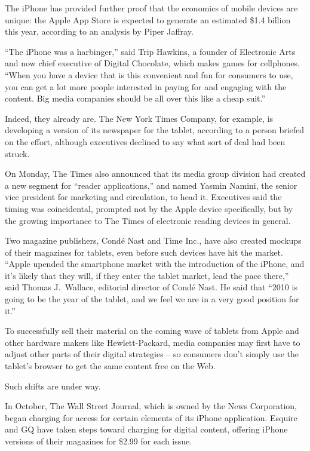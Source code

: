 ﻿\documentclass[12pt]{article}
\begin{document}
The iPhone has provided further proof that the economics of mobile devices are unique: the Apple App
Store is expected to generate an estimated \$1.4 billion this year, according to an analysis by
Piper Jaffray.

``The iPhone was a harbinger,'' said Trip Hawkins, a founder of Electronic Arts and now chief
executive of Digital Chocolate, which makes games for cellphones. ``When you have a device that is
this convenient and fun for consumers to use, you can get a lot more people interested in paying for
and engaging with the content. Big media companies should be all over this like a cheap suit.''

Indeed, they already are. The New York Times Company, for example, is developing a version of its
newspaper for the tablet, according to a person briefed on the effort, although executives declined
to say what sort of deal had been struck.

On Monday, The Times also announced that its media group division had created a new segment for
``reader applications,'' and named Yasmin Namini, the senior vice president for marketing and
circulation, to head it. Executives said the timing was coincidental, prompted not by the Apple
device specifically, but by the growing importance to The Times of electronic reading devices in
general.

Two magazine publishers, Cond\'e Nast and Time Inc., have also created mockups of their magazines
for tablets, even before such devices have hit the market. ``Apple upended the smartphone market
with the introduction of the iPhone, and it's likely that they will, if they enter the tablet
market, lead the pace there,'' said Thomas J.~Wallace, editorial director of Cond\'e Nast. He said
that ``2010 is going to be the year of the tablet, and we feel we are in a very good position for
it.''

To successfully sell their material on the coming wave of tablets from Apple and other hardware
makers like Hewlett-Packard, media companies may first have to adjust other parts of their digital
strategies -- so consumers don't simply use the tablet's browser to get the same content free on the
Web.

Such shifts are under way.

In October, The Wall Street Journal, which is owned by the News Corporation, began charging for
access for certain elements of its iPhone application. Esquire and GQ have taken steps toward
charging for digital content, offering iPhone versions of their magazines for \$2.99 for each issue.
\end{document}
